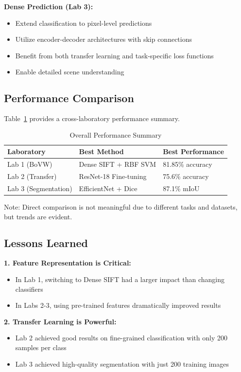 \documentclass[conference]{IEEEtran}
\begin{document}
\textbf{Dense Prediction (Lab 3):}
\begin{itemize}
\item Extend classification to pixel-level predictions
\item Utilize encoder-decoder architectures with skip connections
\item Benefit from both transfer learning and task-specific loss functions
\item Enable detailed scene understanding
\end{itemize}

\subsection{Performance Comparison}

Table~\ref{tab:overall} provides a cross-laboratory performance summary.

\begin{table}[H]
\centering
\caption{Overall Performance Summary}
\label{tab:overall}
\begin{tabular}{@{}lll@{}}
\toprule
\textbf{Laboratory} & \textbf{Best Method} & \textbf{Best Performance} \\ \midrule
Lab 1 (BoVW) & Dense SIFT + RBF SVM & 81.85\% accuracy \\
Lab 2 (Transfer) & ResNet-18 Fine-tuning & 75.6\% accuracy \\
Lab 3 (Segmentation) & EfficientNet + Dice & 87.1\% mIoU \\ \bottomrule
\end{tabular}
\end{table}

Note: Direct comparison is not meaningful due to different tasks and datasets, but trends are evident.

\subsection{Lessons Learned}

\textbf{1. Feature Representation is Critical:}
\begin{itemize}
\item In Lab 1, switching to Dense SIFT had a larger impact than changing classifiers
\item In Labs 2-3, using pre-trained features dramatically improved results
\end{itemize}

\textbf{2. Transfer Learning is Powerful:}
\begin{itemize}
\item Lab 2 achieved good results on fine-grained classification with only 200 samples per class
\item Lab 3 achieved high-quality segmentation with just 200 training images
\end{itemize}
\end{document}
